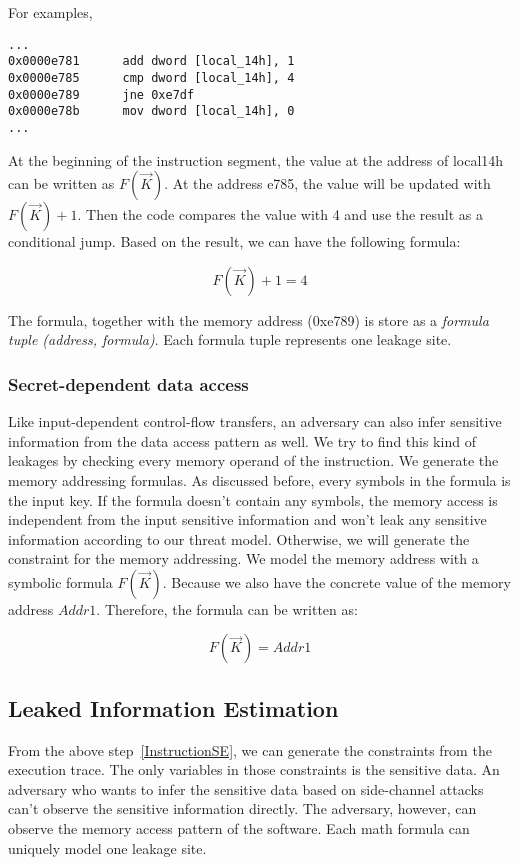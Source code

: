 For examples,

\begin{lstlisting}
...
0x0000e781      add dword [local_14h], 1
0x0000e785      cmp dword [local_14h], 4
0x0000e789      jne 0xe7df
0x0000e78b      mov dword [local_14h], 0
...
\end{lstlisting}

At the beginning of the instruction segment, the value at the 
address of local14h can be written as $F(\vec{K})$. At the address e785, 
the value will be updated with $F(\vec{K})+1$. Then the code compares 
the value with 4 and use the result as a conditional jump. 
Based on the result, we can have the following formula:

$$F(\vec{K}) + 1 = 4$$

The formula, together with the memory address (0xe789) is store
as a \textit{formula tuple (address, formula)}. 
Each formula tuple represents one leakage site.

\subsubsection{Secret-dependent data access}
Like input-dependent control-flow transfers, an adversary can also infer 
sensitive information from the data access pattern as well. 
We try to find this kind of leakages by checking 
every memory operand of the instruction. We generate the memory addressing 
formulas. As discussed before, every symbols in the formula is the input key. 
If the formula doesn’t contain any symbols, the memory access is independent 
from the input sensitive information and won’t leak any sensitive information 
according to our threat model. Otherwise, we will generate the constraint for
the memory addressing. We model the memory address with a symbolic formula 
$F(\vec{K})$. 
Because we also have the concrete value of the memory address $Addr1$. Therefore,
the formula can be written as:

$$F(\vec{K}) = Addr1$$

\subsection{Leaked Information Estimation}

From the above step~\ref{InstructionSE}, we can generate the constraints 
from the execution trace. 
The only variables in those constraints is the sensitive data. An adversary who 
wants to infer the sensitive data based on side-channel attacks can't observe 
the sensitive information directly. The adversary, however, can observe the
memory access pattern of the software. Each math formula can uniquely model
one leakage site.

